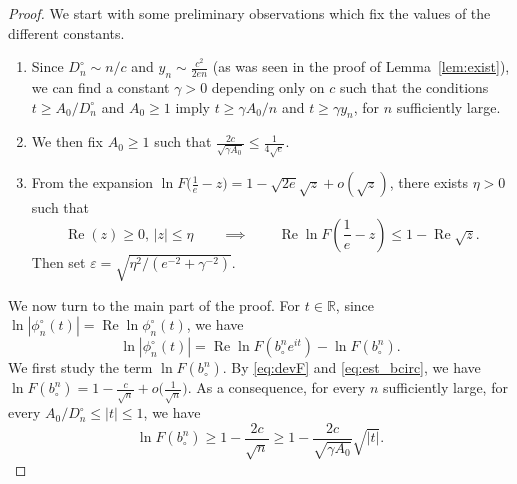 \documentclass[11pt]{article}
\theoremstyle{definition}
\numberwithin{equation}{section}
\numberwithin{figure}{section}
\numberwithin{table}{section}
\renewcommand{\Re}{\operatorname{Re}}
\newcommand{\R}{\mathbb{R}}
\def\bcn{b_{\circ}^{n}}
\def\phicn{\phi^{\circ}_{n}}
\def\Dcn{D^{\circ}_{n}}
\renewcommand{\epsilon}{\varepsilon}
\begin{document}
\begin{proof}We start with some preliminary observations which fix the values of the different constants.
\begin{enumerate}
\item[--]  Since $\Dcn \sim n /c$ and $y_{n} \sim \frac{c^{2}}{2en}$ (as was seen in the proof of Lemma~\ref{lem:exist}),
  we can find a constant $\gamma>0$ depending only on $c$ such that
  the conditions $t \ge  {A_0}/{\Dcn}$ and $A_{0} \geq 1$ imply
  $t \ge {\gamma A_0}/{n}$ and $t \ge \gamma y_{n}$,
  for $n$ sufficiently large.
\item[--] We then fix $A_{0} \geq 1$ such that $\frac{2c}{\sqrt{\gamma A_{0}}} \leq  \frac{1}{4\sqrt{e}}$.
\item[--] From the expansion $ \ln F \big( \tfrac{1}{e}-z \big)= 1-\sqrt{2e} \sqrt{z}+o(\sqrt{z})$, there exists $\eta>0$ such that
\begin{equation}
\label{eq:z} \Re(z) \ge 0, \, |z| \leq \eta  \qquad \implies  \qquad  \Re \ln F \left( \frac{1}{e}-z \right) \leq  1-  \Re \sqrt{z}.
\end{equation}
Then set $\epsilon= \sqrt{\eta^{2}/(e^{-2}+\gamma^{-2})}$.
\end{enumerate}


We now turn to the main part of the proof. For $t \in \R$, since
$ \ln |\phicn(t)| =\Re \ln \phicn(t)$, we have
\begin{equation}
\label{eq:lnphi} \ln |\phicn(t)| =\Re \ln F( \bcn e^{it})- \ln F( \bcn).
\end{equation}
We first study the term $\ln F( \bcn)$.
By \eqref{eq:devF} and \eqref{eq:est_bcirc}, we have $\ln F( \bcn)=1- \tfrac{c}{\sqrt{n}}+ o \big(  \frac{1}{\sqrt{n}} \big)$.  As a consequence, for every $n$ sufficiently large, for every $  {A_{0}}/{\Dcn} \leq |t| \leq 1$, we have
\begin{equation}
\label{eq:ln}\ln F( \bcn) \geq 1- \frac{2c}{\sqrt{n}} \geq 1- \frac{2c}{\sqrt{\gamma A_{0}}} \sqrt{|t|}.
\end{equation}


\end{proof}
\end{document}
